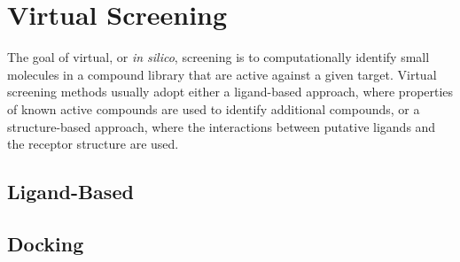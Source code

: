 \section{Virtual Screening}

The goal of virtual, or \textit{in silico}, screening is to computationally identify small molecules in a compound library that are active against a given target.  Virtual screening methods usually adopt either a ligand-based approach, where properties of known active compounds are used to identify additional compounds, or a structure-based approach, where the interactions between putative ligands and the receptor structure are used.

\subsection{Ligand-Based}

\subsection{Docking}
  